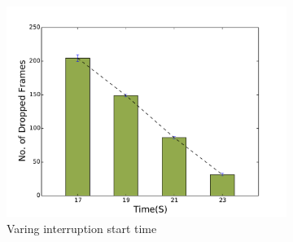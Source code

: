 \begin{figure}[htb]
\centering

\begin{subfigure}[t]{0.32\textwidth}
\centering
\includegraphics[width=\textwidth]{control_start_time.pdf}
\caption{Varing interruption start time}
\label{fig:varying-start} 
\end{subfigure}

\begin{subfigure}[t]{0.32\textwidth}

\end{subfigure}
\end{figure}
